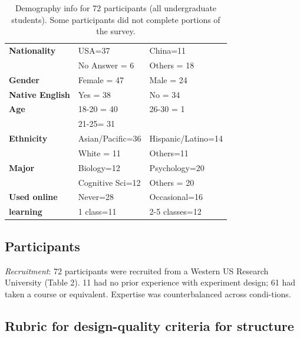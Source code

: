 \vspace{0.25in}
\begin{table}[!ht]
\caption[Demography info for 72 participants (all undergraduate students). Some participants did not complete portions of the survey.]{Demography info for 72 participants (all undergraduate students). Some participants did not complete portions of the survey.}

\vspace{-0.25in}
\begin{center}
\begin{tabular}{|>{\bf}p{1in}|p{1in}|p{1in}|}
\hline
Nationality	&	USA=37		&	China=11\\
			&	No Answer = 6	&	Others = 18\\
Gender		&	Female = 47	&	Male = 24\\
Native English	&	Yes = 38 		&	No = 34\\
Age			&	18-20 = 40	& 	26-30 = 1\\
			&	21-25= 31	&			\\
Ethnicity		&	Asian/Pacific=36 & 	Hispanic/Latino=14\\
			&	White = 11		&	Others=11 \\
Major		&	Biology=12	& 	Psychology=20 \\
			&	Cognitive Sci=12 &	 Others = 20 \\
Used online	& 	Never=28		&	Occasional=16\\
learning		&	1 class=11	&	2-5 classes=12\\
\hline
\end{tabular}
\end{center}
\label{tab:gi-results1}
\end{table}


\subsection{Participants}
\textit{Recruitment}: 72 participants were recruited from a Western US Research University (Table 2). 11 had no prior experience with experiment design; 61 had taken a course or equivalent. Expertise was counterbalanced across condi-tions.   

\subsection{Rubric for design-quality criteria for structure }

